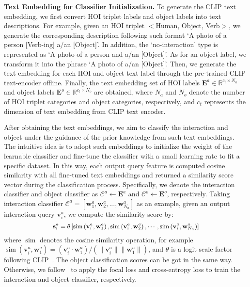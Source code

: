 \documentclass[10pt,twocolumn,letterpaper]{article}
\begin{document}
\vspace{1mm}\noindent\textbf{Text Embedding for Classifier Initialization.} To generate the CLIP text embedding, we first convert HOI triplet labels and object labels into text descriptions. For example, given an HOI triplet $<$Human, Object, Verb$>$, we generate the corresponding description following such format `A photo of a person [Verb-ing] a/an [Object]'. In addition, the `no-interaction' type is represented as `A photo of a person and a/an [Object]'. As for an object label, we transform it into the phrase `A photo of a/an [Object]'. Then, we generate the text embedding for each HOI and object text label through the pre-trained CLIP text-encoder offline. Finally, the text embedding set of HOI labels $\bm{E}^a \in \mathbb{R}^{c_{t} \times N_a}$ and object labels $\bm{E}^o \in \mathbb{R}^{c_{t} \times N_o}$ are obtained, where $N_a$ and $N_o$ denote the number of HOI triplet categories and object categories, respectively, and $c_t$ represents the dimension of text embedding from CLIP text encoder.

After obtaining the text embeddings, we aim to classify the interaction and object under the guidance of the prior knowledge from such text embeddings. The intuitive idea is to adopt such embeddings to initialize the weight of the learnable classifier and fine-tune the classifier with a small learning rate to fit a specific dataset. In this way,  each output query feature is computed cosine similarity with all fine-tuned text embeddings and returned a similarity score vector during the classification process. Specifically, we denote the interaction classifier and object classifier as $\mathcal{C}^a \leftarrow \bm{E}^a$ and $\mathcal{C}^o \leftarrow \bm{E}^o$, respectively. Taking interaction classifier $\mathcal{C}^a = [\mathbf{w}^a_1, \mathbf{w}^a_2,...,\mathbf{w}^a_{N_a}]$ as an example, given an output interaction query $\mathbf{v}_i^a$, we compute the similarity score by:
\begin{equation}
\small
\begin{aligned}
\mathbf{s}^a_i =\theta\left[\operatorname{sim}\left(\mathbf{v}_{i}^a, \mathbf{w}^a_1\right), \operatorname{sim}\left(\mathbf{v}_{i}^a, \mathbf{w}^a_2\right), \cdots, \operatorname{sim}\left(\mathbf{v}_{i}^a, \mathbf{w}^a_{N_a}\right)\right] 
\end{aligned}
\end{equation}
where $\operatorname{sim}$ denotes the cosine similarity operation, for example $\operatorname{sim}\left(\mathbf{v}_{i}^a, \mathbf{w}^a_1\right) = (\mathbf{v}_{i}^a \cdot \mathbf{w}^a_1) /( \|\mathbf{v}_{i}^a \|\|\mathbf{w}^a_1\|)$, and $\theta$ is a logit scale factor following CLIP~\cite{radford2021learning}. The object classification scores can be got in the same way. Otherwise, we follow~\cite{tamura2021qpic} to apply the focal loss and cross-entropy loss to train the interaction and object classifier, respectively.
\end{document}
